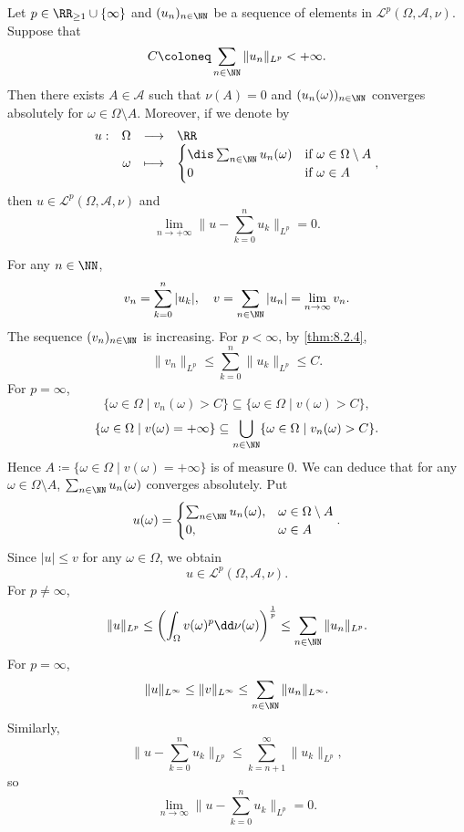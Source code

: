 \begin{lemmaenv}\label{lem:8.2.6}
    Let $p \in \RR_{\ge 1} \cup \{\infty\}$ and $(u_n)_{n \in \NN}$ be a sequence of elements in $\mathcal{L}^{p}(\Omega,\mathscr{A},\nu)$.
    Suppose that
    $$C \coloneq \sum_{n \in \NN}\|u_n\|_{L^p} < + \infty.$$
    Then there exists $A \in \mathscr{A}$ such that $\nu(A) = 0$ and $(u_n(\omega))_{n \in \NN}$ converges absolutely for $\omega \in \Omega \setminus A$.
    Moreover, if we denote by
    $$\begin{array}{rrcl}
        u : & \Omega & \longrightarrow & \RR\\
        & \omega & \longmapsto & \begin{cases}
            \dis \sum_{n \in \NN} u_n(\omega) & \text{if } \omega \in \Omega \setminus A\\
            0 & \text{if } \omega \in A
        \end{cases},
    \end{array}$$
    then $u \in \mathcal{L}^p(\Omega,\mathscr{A},\nu)$ and
    $$\lim_{n \rightarrow +\infty}\|u - \sum_{k=0}^{n}u_k\|_{L^p} = 0.$$
\end{lemmaenv}
\begin{proofenv}
    For any $n \in \NN$,
    $$v_n = \sum_{k=0}^{n}|u_k|, \quad v = \sum_{n \in \NN}|u_n| = \lim_{n \rightarrow \infty} v_n.$$
    The sequence $(v_n)_{n \in \NN}$ is increasing.
    For $p < \infty$, by \ref{thm:8.2.4},
    $$\|v_n\|_{L^p} \le \sum_{k=0}^{n} \|u_k\|_{L^p} \le C.$$
    For $p = \infty$,
    $$\{\omega \in \Omega \mid v_n(\omega) > C\} \subseteq \{\omega \in \Omega \mid v(\omega) > C\},$$
    $$\{\omega \in \Omega \mid v(\omega) = +\infty\} \subseteq \bigcup_{n \in \NN} \{\omega \in \Omega \mid v_{n}(\omega) > C\}.$$
    Hence $A \coloneq \{\omega \in \Omega \mid v(\omega) = + \infty\}$ is of measure $0$.
    We can deduce that for any $\omega \in \Omega \setminus A$, $\sum_{n \in \NN} u_n (\omega)$ converges absolutely.
    Put
    $$u(\omega) = \begin{cases}
        \sum_{n \in \NN} u_n(\omega), & \omega \in \Omega \setminus A\\
        0, & \omega \in A
    \end{cases}.$$
    Since $|u|\le v$ for any $\omega \in \Omega$, we obtain
    $$u \in \mathcal{L}^p(\Omega,\mathscr{A},\nu).$$
    For $p \neq \infty$,
    $$\|u\|_{L^p} \le \left(\int_{\Omega} v(\omega)^p \dd \nu(\omega)\right)^{\frac{1}{p}} \le \sum_{n \in \NN} \|u_n\|_{L^p}.$$
    For $p = \infty$,
    $$\|u\|_{L^\infty} \le \|v\|_{L^\infty} \le \sum_{n \in \NN} \|u_n\|_{L^\infty}.$$
    Similarly,
    $$\|u - \sum_{k=0}^{n}u_k\|_{L^p} \le \sum_{k=n+1}^{\infty}\|u_k\|_{L^p},$$
    so
    $$\lim_{n \rightarrow \infty} \|u - \sum_{k=0}^{n} u_k\|_{L^p} = 0.$$
\end{proofenv}

